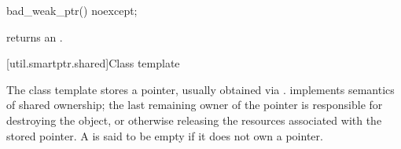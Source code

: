 %
%
\begin{itemdecl}
bad_weak_ptr() noexcept;
\end{itemdecl}

\begin{itemdescr}
\pnum\postconditions  {} returns an
 \ntbs.

\end{itemdescr}

[util.smartptr.shared]{Class template }

\pnum
{}%
The  class template stores a pointer, usually obtained
via .  implements semantics of shared ownership;
the last remaining owner of the pointer is responsible for destroying
the object, or otherwise releasing the resources associated with the stored pointer. A
 is said to be empty if it does not own a pointer.


